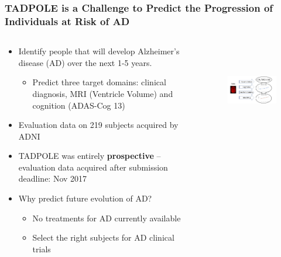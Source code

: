 \documentclass[8pt,xcolor=table,aspectratio=169]{beamer}
\begin{document}
\begin{frame}
\frametitle{TADPOLE is a Challenge to Predict the Progression of Individuals at Risk of AD}


\begin{columns}[t]
\begin{column}[t]{0.5\textwidth}

\begin{itemize}
 \item Identify people that will develop Alzheimer's disease (AD) over the next 1-5 years.

  \begin{itemize}
    \item Predict three target domains: clinical diagnosis, MRI (Ventricle Volume) and cognition (ADAS-Cog 13) 
  \end{itemize}

 \vspace{2em}

  \item Evaluation data on 219 subjects acquired by ADNI

 \vspace{2em}

 \item TADPOLE was entirely \textbf{prospective} -- evaluation data acquired after submission deadline: Nov 2017
 
 \vspace{2em}
 
 
 
 \item Why predict future evolution of AD?
 \begin{itemize}
  \item No treatments for AD currently available
  \item Select the right subjects for AD clinical trials
 \end{itemize}

\end{itemize}


\end{column}
\begin{column}[t]{0.5\textwidth}
 \begin{figure}
\centering
\includegraphics[height=4cm]{tadpole_diagram} 
\end{figure}
\vspace{-1em}


\end{column}
\end{columns}
\end{frame}
\end{document}
